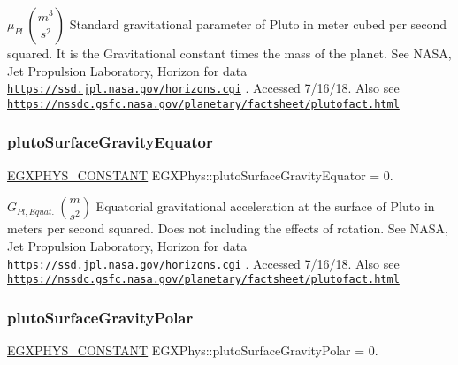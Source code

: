 $ \mu_{Pl} \ (\dfrac{m^3}{s^2})$ Standard gravitational parameter of Pluto in meter cubed per second squared. It is the Gravitational constant times the mass of the planet. See N\+A\+SA, Jet Propulsion Laboratory, Horizon for data \href{https://ssd.jpl.nasa.gov/horizons.cgi}{\tt https\+://ssd.\+jpl.\+nasa.\+gov/horizons.\+cgi} . Accessed 7/16/18. Also see \href{https://nssdc.gsfc.nasa.gov/planetary/factsheet/plutofact.html}{\tt https\+://nssdc.\+gsfc.\+nasa.\+gov/planetary/factsheet/plutofact.\+html} \mbox{\label{group___e_g_x_phys-_constants-_astrophysics-_solar_system-_pluto-_bulk_gaf00d2f0cf5a243cab208536f6d7f50ee}} 
\subsubsection{\texorpdfstring{pluto\+Surface\+Gravity\+Equator}{plutoSurfaceGravityEquator}}
{\footnotesize\ttfamily \mbox{\hyperlink{group___e_g_x_phys-_constants-_macros_ga76980d288494ce1714c9ac68a95ba702}{E\+G\+X\+P\+H\+Y\+S\+\_\+\+C\+O\+N\+S\+T\+A\+NT}} E\+G\+X\+Phys\+::pluto\+Surface\+Gravity\+Equator = 0.}

$ G_{Pl,Equat.} \ (\dfrac{m}{s^2})$ Equatorial gravitational acceleration at the surface of Pluto in meters per second squared. Does not including the effects of rotation. See N\+A\+SA, Jet Propulsion Laboratory, Horizon for data \href{https://ssd.jpl.nasa.gov/horizons.cgi}{\tt https\+://ssd.\+jpl.\+nasa.\+gov/horizons.\+cgi} . Accessed 7/16/18. Also see \href{https://nssdc.gsfc.nasa.gov/planetary/factsheet/plutofact.html}{\tt https\+://nssdc.\+gsfc.\+nasa.\+gov/planetary/factsheet/plutofact.\+html} \mbox{\label{group___e_g_x_phys-_constants-_astrophysics-_solar_system-_pluto-_bulk_gae694708582fa89671ec90cf232dc314e}} 
\subsubsection{\texorpdfstring{pluto\+Surface\+Gravity\+Polar}{plutoSurfaceGravityPolar}}
{\footnotesize\ttfamily \mbox{\hyperlink{group___e_g_x_phys-_constants-_macros_ga76980d288494ce1714c9ac68a95ba702}{E\+G\+X\+P\+H\+Y\+S\+\_\+\+C\+O\+N\+S\+T\+A\+NT}} E\+G\+X\+Phys\+::pluto\+Surface\+Gravity\+Polar = 0.}

